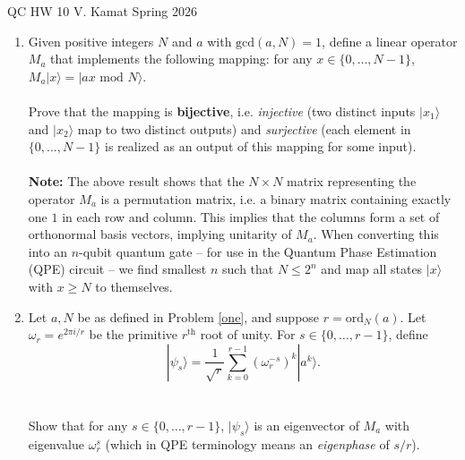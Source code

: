 \documentclass[12pt]{article}
\begin{document}
	
\centerline{QC HW 10
	\hspace{0.4 in}V. Kamat
	\hspace{0.4 in}Spring 2026}

\begin{enumerate}
\item \label{one} Given positive integers $N$ and $a$ with $\text{gcd}(a,N)=1$, define a linear operator $M_a$ that implements the following mapping: for any $x\in \{0,\ldots,N-1\}$, $M_a|x\rangle=|ax\text{ mod } N\rangle$. 
\\
\\
Prove that the mapping is \textbf{bijective}, i.e. \emph{injective} (two distinct inputs $|x_1\rangle$ and $|x_2\rangle$ map to two distinct outputs) and \emph{surjective} (each element in $\{0,\ldots,N-1\}$ is realized as an output of this mapping for some input). 
\\
\\
\textbf{Note:} The above result shows that the $N\times N$ matrix representing the operator $M_a$ is a permutation matrix, i.e. a binary matrix containing exactly one $1$ in each row and column. This implies that the columns form a set of orthonormal basis vectors, implying unitarity of $M_a$. When converting this into an $n$-qubit quantum gate -- for use in the Quantum Phase Estimation (QPE) circuit -- we find smallest $n$ such that $N\leq 2^n$ and map all states $|x\rangle$ with $x\geq N$ to themselves. 

\item Let $a,N$ be as defined in Problem \ref{one}, and suppose $r=\text{ord}_N(a)$. Let $\omega_r=e^{2\pi i/r}$ be the primitive $r^{\text{th}}$ root of unity. For $s\in \{0,\ldots,r-1\}$, define $$|\psi_s\rangle=\dfrac{1}{\sqrt{r}}\displaystyle\sum_{k=0}^{r-1} (\omega_r^{-s})^k|a^k\rangle.$$
\\
\\
Show that for any $s\in \{0,\ldots,r-1\}$, $|\psi_s\rangle$ is an eigenvector of $M_a$ with eigenvalue $\omega_r^s$ (which in QPE terminology means an \emph{eigenphase} of $s/r$).


\end{enumerate}
\end{document}
